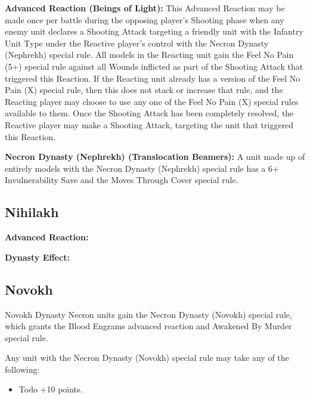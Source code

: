 \textbf{Advanced Reaction (Beings of Light):} This Advanced Reaction may be made once per battle during the opposing player’s Shooting phase when any enemy unit declares a Shooting Attack targeting a friendly unit with the Infantry Unit Type under the Reactive player’s control with the Necron Dynasty (Nephrekh) special rule. All models in the Reacting unit gain the Feel No Pain (5+) special rule against all Wounds inflicted as part of the Shooting Attack that triggered this Reaction. If the Reacting unit already has a version of the Feel No Pain (X) special rule, then this does not stack or increase that rule, and the Reacting player may choose to use any one of the Feel No Pain (X) special rules available to them. Once the Shooting Attack has been completely resolved, the Reactive player may make a Shooting Attack, targeting the unit that triggered this Reaction.

\textbf{Necron Dynasty (Nephrekh) (Translocation Beamers):} A unit made up of entirely models with the Necron Dynasty (Nephrekh) special rule has a 6+ Invulnerability Save and the Moves Through Cover special rule. 


\subsection{Nihilakh}

\textbf{Advanced Reaction:}

\textbf{Dynasty Effect:}


\subsection{Novokh}

Novokh Dynasty Necron units gain the Necron Dynasty (Novokh) special rule, which grants the Blood Engrams advanced reaction and Awakened By Murder special rule.

Any unit with the Necron Dynasty (Novokh) special rule may take any of the following:
\begin{itemize}
	\item Todo \dotfill +10 points.
\end{itemize}

